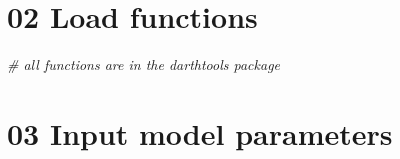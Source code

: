 \documentclass[
]{article}
\newenvironment{Shaded}{\begin{snugshade}}{\end{snugshade}}
\newcommand{\CommentTok}[1]{\textcolor[rgb]{0.56,0.35,0.01}{\textit{#1}}}
\begin{document}
\hypertarget{load-functions}{%
\section{02 Load functions}\label{load-functions}}

\begin{Shaded}
\begin{Highlighting}[]
\CommentTok{# all functions are in the darthtools package}
\end{Highlighting}
\end{Shaded}

\hypertarget{input-model-parameters}{%
\section{03 Input model parameters}\label{input-model-parameters}}
\end{document}
